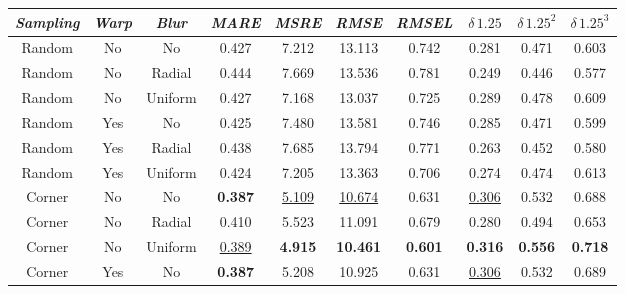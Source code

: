 \begin{table}
    \begin{adjustwidth}{-0.2\textwidth}{-0.2\textwidth}
        \centering
    \begin{tabular}{c|c|c|c|c|c|c|c|c|c}
        \emph{Sampling} & \emph{Warp} & \emph{Blur} & \emph{MARE} & \emph{MSRE} & \emph{RMSE} & \emph{RMSEL} & \emph{$\delta \, 1.25$} & \emph{$\delta \, 1.25^{2}$} & \emph{$\delta \, 1.25^{3}$} \\
        \hline
        Random & No  & No      &            0.427  &            7.212  &            13.113  &            0.742  &            0.281  &            0.471  &            0.603  \\
        Random & No  & Radial  &            0.444  &            7.669  &            13.536  &            0.781  &            0.249  &            0.446  &            0.577  \\
        Random & No  & Uniform &            0.427  &            7.168  &            13.037  &            0.725  &            0.289  &            0.478  &            0.609  \\
        Random & Yes & No      &            0.425  &            7.480  &            13.581  &            0.746  &            0.285  &            0.471  &            0.599  \\
        Random & Yes & Radial  &            0.438  &            7.685  &            13.794  &            0.771  &            0.263  &            0.452  &            0.580  \\
        Random & Yes & Uniform &            0.424  &            7.205  &            13.363  &            0.706  &            0.274  &            0.474  &            0.613  \\
        Corner & No  & No      &    \textbf{0.387} & \underline{5.109} & \underline{10.674} &            0.631  & \underline{0.306} &            0.532  &            0.688  \\
        Corner & No  & Radial  &            0.410  &            5.523  &            11.091  &            0.679  &            0.280  &            0.494  &            0.653  \\
        Corner & No  & Uniform & \underline{0.389} &    \textbf{4.915} &    \textbf{10.461} &    \textbf{0.601} &    \textbf{0.316} &    \textbf{0.556} &    \textbf{0.718} \\
        Corner & Yes & No      &    \textbf{0.387} &            5.208  &            10.925  &            0.631  & \underline{0.306} &            0.532  &            0.689  \\

\end{tabular}
\end{adjustwidth}
\end{table}
